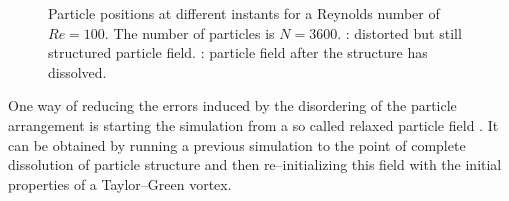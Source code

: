 \documentclass{report}
\begin{document}
\begin{figure}[h]
\label{fig:results_TG_Re100_Positions}
\caption[Particle positions for Taylor--Green at $Re=100$]{Particle positions at different instants for a Reynolds number of $Re=100$. The number of particles is $N=3600$. : distorted but still structured particle field. : particle field after the structure has dissolved.} 
\end{figure}

One way of reducing the errors induced by the disordering of the particle arrangement is starting the simulation from a so called relaxed particle field \cite{Ellero2007}. It can be obtained by running a previous simulation to the point of complete dissolution of particle structure and then re--initializing this field with the initial properties of a Taylor--Green vortex. 
\end{document}
